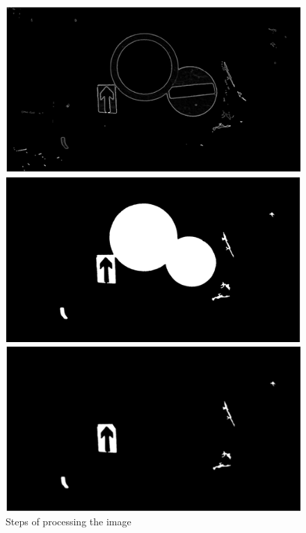 \begin{figure}[H]
	\newline
	\includegraphics[width=\linewidth]{images/zynq3.png}
	\caption{}\label{fig:zynq3}
	\endminipage\hfill
	\includegraphics[width=\linewidth]{images/zynq4.png}
	\caption{}\label{fig:zynq4}
	\endminipage\hfill
	\includegraphics[width=\linewidth]{images/zynq5.png}
	\caption{}\label{fig:zynq5}
	\endminipage
	\newline
	\caption{Steps of processing the image \cite{zynq}}
\end{figure}

